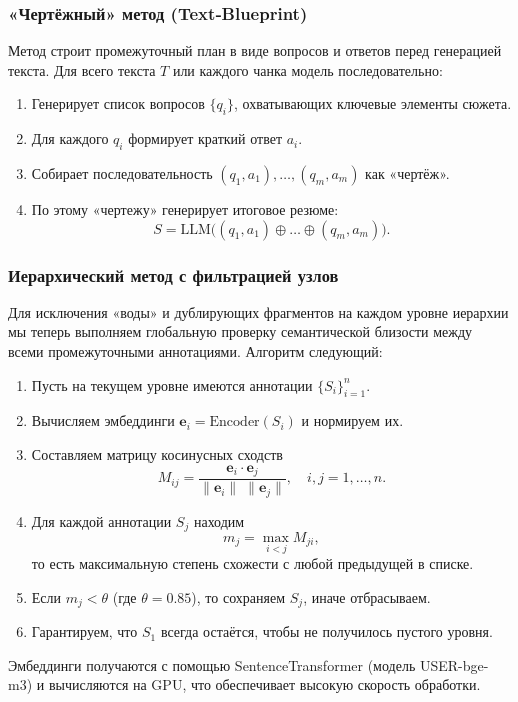 \documentclass{article}
\theoremstyle{definition}
\theoremstyle{plain}
\begin{document}
\subsubsection*{«Чертёжный» метод (Text‑Blueprint)}
Метод строит промежуточный план в виде вопросов и ответов перед генерацией текста. 
Для всего текста $T$ или каждого чанка модель последовательно:
\begin{enumerate}
  \item Генерирует список вопросов $\{q_i\}$, охватывающих ключевые элементы сюжета.
  \item Для каждого $q_i$ формирует краткий ответ $a_i$.
  \item Собирает последовательность $(q_1,a_1),\dots,(q_m,a_m)$ как «чертёж».
  \item По этому «чертежу» генерирует итоговое резюме: 
    \[
      S = \mathrm{LLM}\bigl((q_1,a_1)\oplus\dots\oplus(q_m,a_m)\bigr).
    \]
\end{enumerate}

\subsubsection*{Иерархический метод с фильтрацией узлов}
Для исключения «воды» и дублирующих фрагментов на каждом уровне иерархии мы теперь выполняем глобальную проверку семантической близости между всеми промежуточными аннотациями. Алгоритм следующий:

\begin{enumerate}
  \item Пусть на текущем уровне имеются аннотации $\{S_i\}_{i=1}^n$.
  \item Вычисляем эмбеддинги $\mathbf{e}_i = \mathrm{Encoder}(S_i)$ и нормируем их.
  \item Составляем матрицу косинусных сходств
    \[
      M_{ij} = \frac{\mathbf{e}_i \cdot \mathbf{e}_j}{\|\mathbf{e}_i\|\;\|\mathbf{e}_j\|},
      \quad i,j=1,\dots,n.
    \]
  \item Для каждой аннотации $S_j$ находим
    \[
      m_j = \max_{\,i<j} M_{ji},
    \]
    то есть максимальную степень схожести с любой предыдущей в списке.
  \item Если $m_j < \theta$ (где $\theta=0.85$), то сохраняем $S_j$, иначе отбрасываем.
  \item Гарантируем, что $S_1$ всегда остаётся, чтобы не получилось пустого уровня.
\end{enumerate}
Эмбеддинги получаются с помощью SentenceTransformer (модель USER-bge-m3) и вычисляются на GPU, что обеспечивает высокую скорость обработки.
\end{document}
